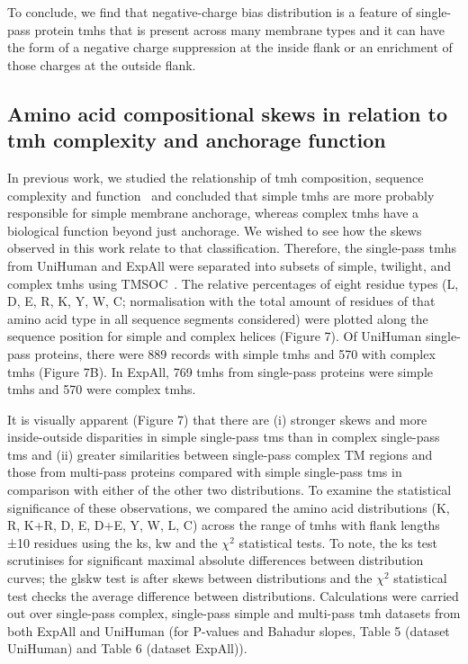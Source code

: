 To conclude, we find that negative-charge bias distribution is a feature of single-pass protein \gls{tmh}s that is present across many membrane types and it can have the form of a negative charge suppression at the inside flank or an enrichment of those charges at the outside flank.

\subsection{Amino acid compositional skews in relation to \gls{tmh} complexity and anchorage function}

In previous work, we studied the relationship of \gls{tmh} composition, sequence complexity and function~\cite{Wong2010, Wong2011, Wong2012} and concluded that simple \gls{tmh}s are more probably responsible for simple membrane anchorage, whereas complex \gls{tmh}s have a biological function beyond just anchorage. We wished to see how the skews observed in this work relate to that classification. Therefore, the single-pass \gls{tmh}s from UniHuman and ExpAll were separated into subsets of simple, twilight, and complex \gls{tmh}s using TMSOC~\cite{Wong2011, Wong2012}. The relative percentages of eight residue types (L, D, E, R, K, Y, W, C\@; normalisation with the total amount of residues of that amino acid type in all sequence segments considered) were plotted along the sequence position for simple and complex helices (Figure 7). Of UniHuman single-pass proteins, there were 889 records with simple \gls{tmh}s and 570 with complex \gls{tmh}s (Figure 7B). In ExpAll, 769 \gls{tmh}s from single-pass proteins were simple \gls{tmh}s and 570 were complex \gls{tmh}s.

It is visually apparent (Figure 7) that there are (i) stronger skews and more inside-outside disparities in simple single-pass \gls{tm}s than in complex single-pass \gls{tm}s and (ii) greater similarities between single-pass complex TM regions and those from multi-pass proteins compared with simple single-pass \gls{tm}s in comparison with either of the other two distributions. To examine the statistical significance of these observations, we compared the amino acid distributions (K, R, K+R, D, E, D+E, Y, W, L, C) across the range of \gls{tmh}s with flank lengths ±10 residues using the \gls{ks}, \gls{kw} and the \({\chi}^{2}\) statistical tests. To note, the \gls{ks} test scrutinises for significant maximal absolute differences between distribution curves; the gls{kw} test is after skews between distributions and the \({\chi}^{2}\) statistical test checks the average difference between distributions. Calculations were carried out over single-pass complex, single-pass simple and multi-pass \gls{tmh} datasets from both ExpAll and UniHuman (for P-values and Bahadur slopes, Table 5 (dataset UniHuman) and Table 6 (dataset ExpAll)).

